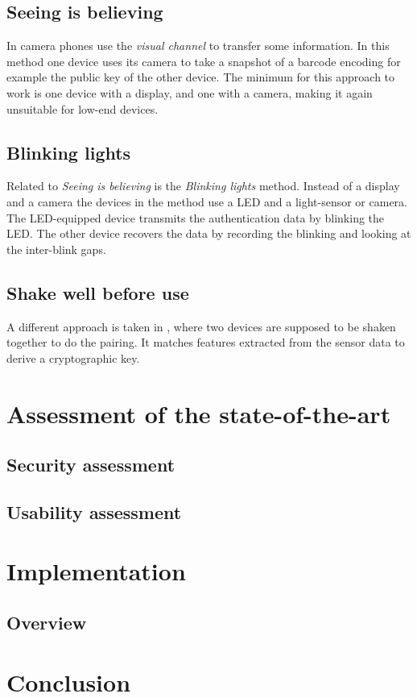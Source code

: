 \documentclass[conference, 11pt]{sty/IEEEtran}
\begin{document}
\subsection{Seeing is believing}
In \cite{mccune2005seeing} camera phones use the \textit{visual channel} to transfer some information.
In this method one device uses its camera to take a snapshot of a barcode encoding for example the public key of the other device.
The minimum for this approach to work is one device with a display, and one with a camera, making it again unsuitable for low-end devices.

\subsection{Blinking lights}
Related to \textit{Seeing is believing} is the \textit{Blinking lights} method.
Instead of a display and a camera the devices in the method use a LED and a light-sensor or camera.
The LED-equipped device transmits the authentication data by blinking the LED.
The other device recovers the data by recording the blinking and looking at the inter-blink gaps.

\subsection{Shake well before use}
A different approach is taken in \cite{mayrhofer2009shake}, where two devices are supposed to be shaken together to do the pairing.
It matches features extracted from the sensor data to derive a cryptographic key.

\section{Assessment of the state-of-the-art}
\label{sec:assessment_of_the_state_of_the_art}

\subsection{Security assessment}
\label{ssec:security_assessment}

\subsection{Usability assessment}
\label{ssec:usability_assessment}

\section{Implementation}
\label{sec:implementation}

\subsection{Overview}
\label{ssec:overview}

\section{Conclusion}
\label{sec:conclusion}



\end{document}

